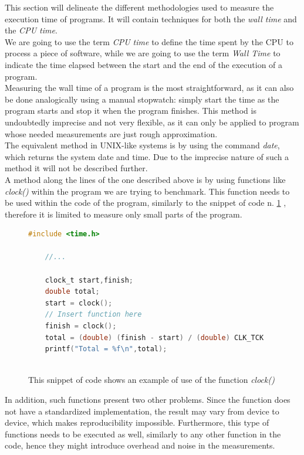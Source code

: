 This section will delineate the different methodologies used to measure the execution time of programs. It will contain techniques for both the \textit{wall time} and the \textit{CPU time}. \\
We are going to use the term  \textit{CPU time} to define the time spent by the CPU to process a piece of software, while we are going to use the term \textit{Wall Time} to indicate the time elapsed between the start and the end of the execution of a program.\\\hfill
Measuring the wall time of a program is the most straightforward, as it can also be done analogically using a manual stopwatch: simply start the time as the program starts and stop it when the program finishes. This method is undoubtedly imprecise and not very flexible, as it can only be applied to program whose needed measurements are just rough approximation.\cite{Stewart2001MeasuringET}\\
The equivalent method in UNIX-like systems is by using the command \textit{date}, which returns the system date and time. Due to the imprecise nature of such a method it will not be described further. \\
A method along the lines of the one described above is by using functions like \textit{clock()} within the program we are trying to benchmark. This function needs to be used within the code of the program, similarly to the snippet of code n. \ref{fig:code} \cite{Stewart2001MeasuringET}, therefore it is limited to measure only small parts of the program. \\
\begin{figure}
\begin{lstlisting}[language=C, label= code]
    #include <time.h>
    
    //...
    
    clock_t start,finish;
    double total;
    start = clock();
    // Insert function here
    finish = clock();
    total = (double) (finish - start) / (double) CLK_TCK
    printf("Total = %f\n",total);
    
\end{lstlisting}
\caption{This snippet of code shows an example of use of the function \textit{clock()}}
\label{fig:code}
\end{figure}
In addition, such functions present two other problems. Since the function does not have a standardized implementation, the result may vary from device to device, which makes reproducibility impossible. 
Furthermore, this type of functions needs to be executed as well, similarly to any other function in the code, hence they might introduce overhead and noise in the measurements. \\

